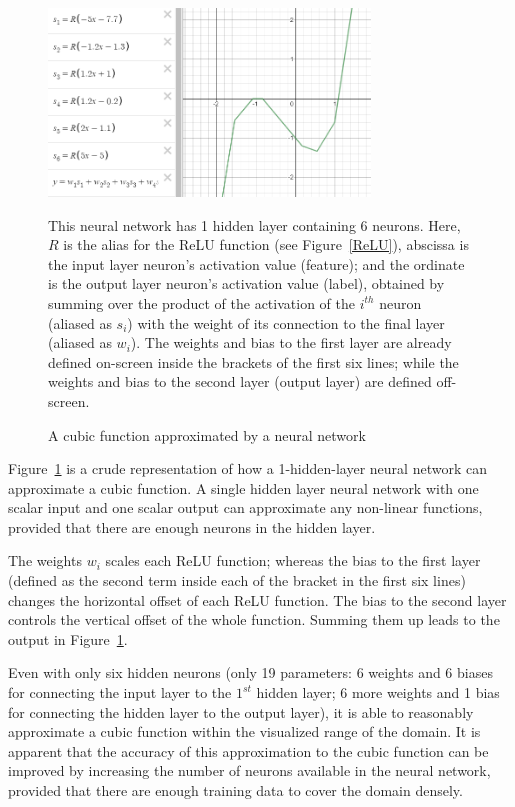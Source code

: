 \documentclass[a4paper, 12pt]{article}
\begin{document}
    \begin{figure}[H]
        
    \begin{center}
        \includegraphics[height=5cm]{PPT/UniversalApproximationTheorem.png}
        \caption{A cubic function approximated by a neural network}\label{UniversalApproximationTheorem}
    \end{center}
    This neural network has 1 hidden layer containing 6 neurons.
    Here, $R$ is the alias for the ReLU function (see Figure~\ref{ReLU}), abscissa is the input layer neuron's activation value (feature); and the ordinate is the output layer neuron's activation value (label), obtained by summing over the product of the activation of the $i^{th}$ neuron (aliased as $s_i$) with the weight of its connection to the final layer (aliased as $w_i$).
    The weights and bias to the first layer are already defined on-screen inside the brackets of the first six lines; while the weights and bias to the second layer (output layer) are defined off-screen.
    \end{figure}
    
    Figure~\ref{UniversalApproximationTheorem} is a crude representation of how a 1-hidden-layer neural network can approximate a cubic function. A single hidden layer neural network with one scalar input and one scalar output can approximate any non-linear functions, provided that there are enough neurons in the hidden layer.

    The weights $w_i$ scales each ReLU function; whereas the bias to the first layer (defined as the second term inside each of the bracket in the first six lines) changes the horizontal offset of each ReLU function. The bias to the second layer controls the vertical offset of the whole function. Summing them up leads to the output in Figure~\ref{UniversalApproximationTheorem}.

    Even with only six hidden neurons (only 19 parameters: 6 weights and 6 biases for connecting the input layer to the $1^{st}$ hidden layer; 6 more weights and 1 bias for connecting the hidden layer to the output layer), it is able to reasonably approximate a cubic function within the visualized range of the domain. It is apparent that the accuracy of this approximation to the cubic function can be improved by increasing the number of neurons available in the neural network, provided that there are enough training data to cover the domain densely.
\end{document}
